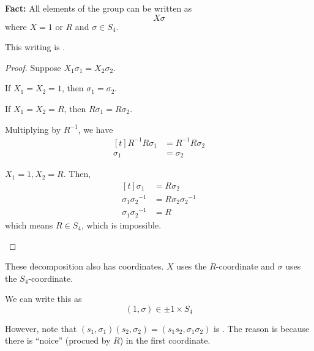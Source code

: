 \textbf{Fact:} All elements of the group can be written as \[
    X \sigma
\] where $X = 1 \text{ or } R$ and $\sigma \in S_4$. 

\begin{proposition}
    This writing is . 
\end{proposition}

\begin{proof}
    Suppose $X_1 \sigma_1 = X_2 \sigma_2$. 

    \begin{listu}
        \item If $X_1 = X_2 = 1$, then $\sigma_1 = \sigma_2$.

        \item If $X_1 = X_2 = R$, then $R \sigma_1 = R \sigma_2$.

        Multiplying by $R^{-1}$, we have \[ \begin{aligned}[t]
            R^{-1} R \sigma_1 & = R^{-1} R \sigma_2 \\
            \sigma_1          & = \sigma_2
        \end{aligned} \]

        \item $X_1 = 1, X_2 = R$. Then, \[ \begin{aligned}[t]
            \sigma_1 & = R \sigma_2 \\
            \sigma_1 {\sigma_2}^{-1} & = R \sigma_2 {\sigma_2}^{-1} \\
            \sigma_1 {\sigma_2}^{-1} & = R
        \end{aligned} \] which means $R \in S_4$, which is impossible.
    \end{listu}
\end{proof}

These decomposition also has coordinates. $X$ uses the $R$-coordinate and $\sigma$ uses the $S_4$-coordinate.

We can write this as \[
    (1, \sigma) \in \pm 1 \times S_4
\]

However, note that $(s_1, \sigma_1) (s_2, \sigma_2) = (s_1 s_2, \sigma_1 \sigma_2)$ is . The reason is because there is ``noice'' (procued by $R$) in the first coordinate.

